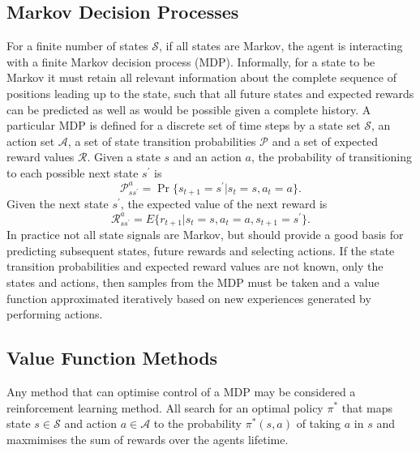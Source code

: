 \subsection{Markov Decision Processes}
For a finite number of states $\mathscr{S}$, if all states are Markov, the
agent is interacting with a finite Markov decision process (MDP).  Informally,
for a state to be Markov it must retain all relevant information about the
complete sequence of positions leading up to the state, such that all future
states and expected rewards can be predicted as well as would be possible given
a complete history.  A particular MDP is defined for a discrete set of time
steps by a state set $\mathscr{S}$, an action set $\mathscr{A}$, a set of state
transition probabilities $\mathscr{P}$ and a set of expected reward values
$\mathscr{R}$.  Given a state $s$ and an action $a$, the probability of
transitioning to each possible next state $s^\prime$ is
\begin{equation}
\mathscr{P}^a_{ss^\prime} = \Pr \bigl\lbrace s_{t+1} = s^\prime \vert s_t=s,
a_t=a \bigr\rbrace .
\end{equation}
Given the next state $s^\prime$, the expected value of the next reward is
\begin{equation}
\mathscr{R}^a_{ss^\prime} = E \bigl\lbrace r_{t+1} \vert s_t=s, a_t=a,
s_{t+1}=s^\prime \bigr\rbrace .
\end{equation}
In practice not all state signals are Markov, but should provide a good basis
for predicting subsequent states, future rewards and selecting actions.  If the
state transition probabilities and expected reward values are not known, only
the states and actions, then samples from the MDP must be taken and a value
function approximated iteratively based on new experiences generated by
performing actions.

\subsection{Value Function Methods}
\label{sec:valuebased}
Any method that can optimise control of a MDP may be considered a reinforcement
learning method.  All search for an optimal policy $\pi^*$ that maps state
$s \in \mathscr{S}$ and action $a \in \mathscr{A}$ to the probability
$\pi^*(s,a)$ of taking $a$ in $s$ and maxmimises the sum of rewards over the
agents lifetime.

